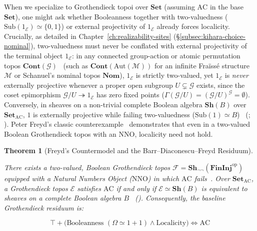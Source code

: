 \documentclass[10pt,twoside,openright]{book}
\theoremstyle{crmplain}
\newtheorem{theorem}{Theorem}[section]
\theoremstyle{crmdef}
\theoremstyle{crmremark}
\begin{document}
When we specialize to Grothendieck topoi over $\mathbf{Set}$ (assuming $\mathrm{AC}$ in the base $\mathbf{Set}$), one might ask whether Booleanness together with two-valuedness ($\mathrm{Sub}(1_{\mathcal{E}}) \simeq \{0, 1\}$) or external projectivity of $1_{\mathcal{E}}$ already forces localicity. Crucially, as detailed in Chapter~\ref{ch:realizability-sites} (\S\ref{subsec:kihara-choice-nominal}), two-valuedness must never be conflated with external projectivity of the terminal object $1_{\mathcal{E}}$: in any connected group-action or atomic permutation topos $\mathbf{Cont}(\mathcal{G})$~\cite[Ch.~III, \S 9]{MacLaneMoerdijk92} (such as $\mathbf{Cont}(\mathrm{Aut}(\mathcal{M}))$ for an infinite Fra\"iss\'e structure $\mathcal{M}$ or Schanuel's nominal topos $\mathbf{Nom}$), $1_{\mathcal{E}}$ is strictly two-valued, yet $1_{\mathcal{E}}$ is \emph{never} externally projective whenever a proper open subgroup $U \subsetneq \mathcal{G}$ exists, since the coset epimorphism $\mathcal{G}/U \twoheadrightarrow 1_{\mathcal{E}}$ has zero fixed points ($\Gamma(\mathcal{G}/U) = (\mathcal{G}/U)^{\mathcal{G}} = \emptyset$). Conversely, in sheaves on a non-trivial complete Boolean algebra $\mathbf{Sh}(B)$ over $\mathbf{Set}_{\mathrm{AC}}$, $1$ is externally projective while failing two-valuedness ($\mathrm{Sub}(1) \simeq B$)~\cite{Barr74} (\cite[\S D4.5]{Johnstone02}; \cite[Chs.~VI, IX]{MacLaneMoerdijk92}). Peter Freyd's classic counterexample~\cite{Freyd72} demonstrates that even in a two-valued Boolean Grothendieck topos with an $\mathrm{NNO}$, localicity need not hold.

\begin{theorem}[Freyd's Countermodel and the Barr--Diaconescu--Freyd Residuum]\label{thm:bdf}%
%

There exists a two-valued, Boolean Grothendieck topos $\mathcal{F} = \mathbf{Sh}_{\neg\neg}(\mathbf{FinInj}^{\mathrm{op}})$ equipped with a Natural Numbers Object ($\mathrm{NNO}$) in which $\mathrm{AC}$ fails~\cite{Freyd72}. Over $\mathbf{Set}_{\mathrm{AC}}$, a Grothendieck topos $\mathcal{E}$ satisfies $\mathrm{AC}$ if and only if $\mathcal{E} \simeq \mathbf{Sh}(B)$ is equivalent to sheaves on a complete Boolean algebra $B$~\cite{Barr74,Diaconescu75,Freyd72} (\cite[\S D4.5, Thms.~D4.5.3--D4.5.7]{Johnstone02}). Consequently, the baseline Grothendieck residuum is:

\[
  \top + \bigl(\text{Booleanness } (\Omega \simeq 1+1) \wedge \text{Localicity}\bigr) \iff \mathrm{AC}
\]

\end{theorem}
\end{document}

